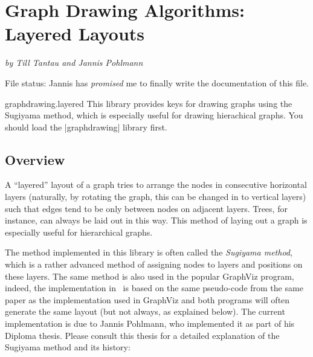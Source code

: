 %
%
%

\section{Graph Drawing Algorithms: Layered Layouts}

{\emph{by  Till Tantau and Jannis Pohlmann}}

File status: Jannis has \emph{promised} me to finally write the
documentation of this file.

\begin{tikzlibrary}{graphdrawing.layered}
  This library provides keys for drawing graphs using the Sugiyama
  method, which is especially useful for drawing hierachical graphs.
  You should load the |graphdrawing| library first.
\end{tikzlibrary}



\subsection{Overview}

A ``layered'' layout of a graph tries to arrange the nodes in
consecutive horizontal layers (naturally, by rotating the graph, this
can be changed in to vertical layers) such that edges tend to be only
between nodes on adjacent layers. Trees, for instance, can always be
laid out in this way. This method of laying out a graph is especially
useful for hierarchical graphs.

The method implemented in this library is often called the
\emph{Sugiyama method}, which is a rather advanced method of
assigning nodes to layers and positions on these layers. The same
method is also used in the popular GraphViz program, indeed, the
implementation in \tikzname\ is based on the same pseudo-code from the
same paper as the implementation used in GraphViz and both programs
will often generate the same layout (but not always, as explained
below). The current implementation is due to Jannis Pohlmann, who
implemented it as part of his Diploma thesis. Please consult this
thesis for a detailed explanation of the Sugiyama method and its
history:

